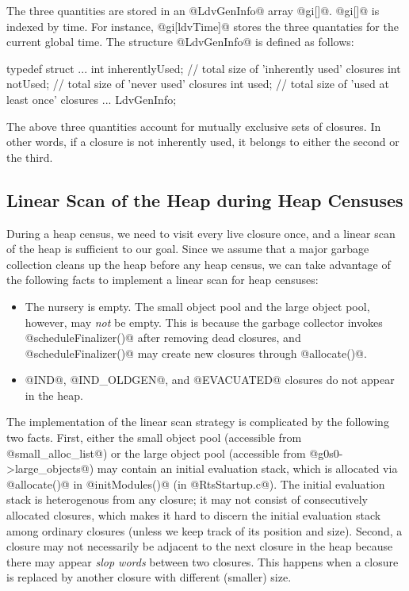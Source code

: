 \documentclass{article}
\begin{document}
The three quantities are stored in an @LdvGenInfo@ array @gi[]@.
@gi[]@ is indexed by time. 
For instance, @gi[ldvTime]@ stores the three quantaties for the current
global time.
The structure @LdvGenInfo@ is defined as follows:

\begin{code}
typedef struct {
  ...
  int inherentlyUsed;   // total size of 'inherently used' closures
  int notUsed;          // total size of 'never used' closures
  int used;             // total size of 'used at least once' closures
  ...
} LdvGenInfo;
\end{code} 

The above three quantities account for mutually exclusive sets of closures.
In other words, if a closure is not inherently used, it belongs to 
either the second or the third.

\subsection{Linear Scan of the Heap during Heap Censuses}

During a heap census, we need to visit every live closure once, and a linear
scan of the heap is sufficient to our goal. 
Since we assume that a major garbage collection cleans up the heap before
any heap census, we can take advantage of the following facts to implement
a linear scan for heap censuses:

\begin{itemize}
\item The nursery is empty. The small object pool and the large object pool, 
      however, may \emph{not} be empty. This is because the garbage collector
      invokes @scheduleFinalizer()@ after removing dead closures, and
      @scheduleFinalizer()@ may create new closures through @allocate()@.
\item @IND@, @IND_OLDGEN@, and @EVACUATED@ closures do not appear in the heap.
\end{itemize}

The implementation of the linear scan strategy is complicated by the
following two facts. 
First, either the small object pool (accessible from @small_alloc_list@) 
or the large object pool (accessible from @g0s0->large_objects@) 
may contain an initial evaluation stack, which is allocated via @allocate()@ in 
@initModules()@ (in @RtsStartup.c@).
The initial evaluation stack is heterogenous from any closure; it may not
consist of consecutively allocated closures, which makes it
hard to discern the initial evaluation stack among ordinary closures (unless
we keep track of its position and size). 
Second, a closure may not necessarily be adjacent to the next closure in the heap
because there may appear \emph{slop words} between two closures.
This happens when a closure is replaced by another closure with different 
(smaller) size.
\end{document}
